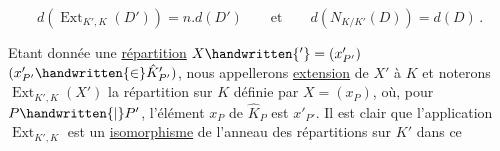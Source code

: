 \[ d(\operatorname{Ext}_{K',K}(D'))=n.d(D')\qquad\text{et}\qquad d(N_{K/K'}(D))=d(D)\,.\tag*{(38)} \]

Etant donnée une \uline{répartition}  $X\handwritten{'}=(x'_{P'})$ $(x'_{P'}\handwritten{\in}\hat K'_{P'})$, nous appellerons \uline{extension} de $X'$ à $K$ et noterons $\operatorname{Ext}_{K',K}(X')$ la répartition sur $K$ définie par $X=(x_P)$, où, pour $P\handwritten{\mid} P'$, l'élément $x_P$ de $\hat K_P$ est $x'_{P'}$. Il est clair que l'application $\operatorname{Ext}_{K',K}$ est un \uline{isomorphisme} de l'anneau des répartitions sur $K'$ dans ce
